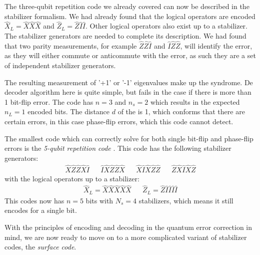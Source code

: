 The three-qubit repetition code we already covered can now be described in the stabilizer formalism. We had already found that the logical operators are encoded $\hat{X}_L = \hat{X}\hat{X}\hat{X}$ and $\hat{Z}_L = \hat{Z}\hat{I}\hat{I}$. Other logical operators also exist up to a stabilizer. The stabilizer generators are needed to complete its description. We had found that two parity measurements, for example $\hat{Z}\hat{Z}\hat{I}$ and $\hat{I}\hat{Z}\hat{Z}$, will identify the error, as they will either commute or anticommute with the error, as such they are a set of independent stabilizer generators. 

The resulting measurement of '+1' or '-1' eigenvalues make up the syndrome. De decoder algorithm here is quite simple, but fails in the case if there is more than 1 bit-flip error. The code has $n=3$ and $n_s=2$ which results in the expected $n_L = 1$ encoded bits. The distance $d$ of the is 1, which conforms that there are certain errors, in this case phase-flip errors, which this code cannot detect.

The smallest code which can correctly solve for both single bit-flip and phase-flip errors is the \emph{5-qubit repetition code} \cite{laflamme1996perfect}. This code has the following stabilizer generators:
\begin{align}
  \hat{X}\hat{Z}\hat{Z}\hat{X}\hat{I} && \hat{I}\hat{X}\hat{Z}\hat{Z}\hat{X} && \hat{X}\hat{I}\hat{X}\hat{Z}\hat{Z} && \hat{Z}\hat{X}\hat{I}\hat{X}\hat{Z}
\end{align}
with the logical operators up to a stabilizer:
\begin{align}
  & \hat{X}_L = \hat{X}\hat{X}\hat{X}\hat{X}\hat{X} && \hat{Z}_L = \hat{Z}\hat{I}\hat{I}\hat{I}\hat{I} &
\end{align}
This codes now has $n=5$ bits with $N_s = 4$ stabilizers, which means it still encodes for a single bit.

\vspace{1em}
With the principles of encoding and decoding in the quantum error correction in mind, we are now ready to move on to a more complicated variant of stabilizer codes, the \emph{surface code}. 



